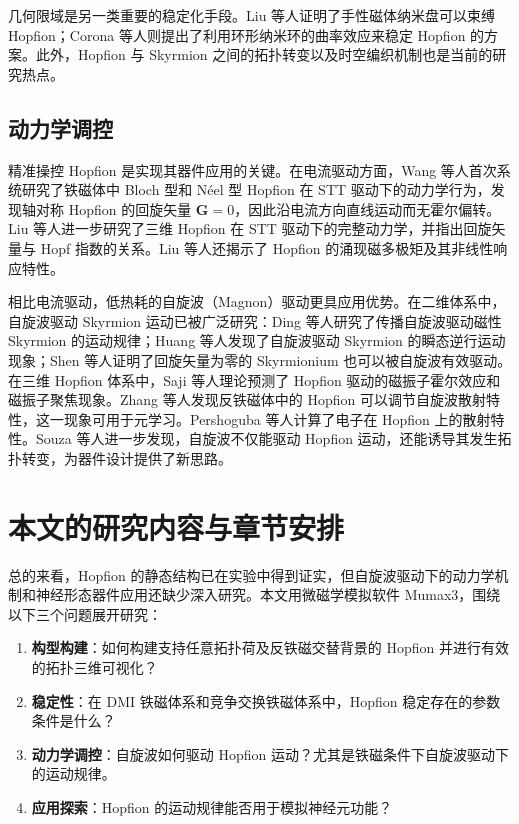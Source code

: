 几何限域是另一类重要的稳定化手段。Liu 等人证明了手性磁体纳米盘可以束缚 Hopfion\cite{liu2018binding}；Corona 等人则提出了利用环形纳米环的曲率效应来稳定 Hopfion 的方案\cite{corona2023curvature}。此外，Hopfion 与 Skyrmion 之间的拓扑转变\cite{gao2024topological,souza2025topological}以及时空编织机制\cite{knapman2024spacetime}也是当前的研究热点。

\subsection{动力学调控}

精准操控 Hopfion 是实现其器件应用的关键。在电流驱动方面，Wang 等人首次系统研究了铁磁体中 Bloch 型和 N\'{e}el 型 Hopfion 在 STT 驱动下的动力学行为，发现轴对称 Hopfion 的回旋矢量 $\mathbf{G} = 0$，因此沿电流方向直线运动而无霍尔偏转\cite{wang2019current}。Liu 等人进一步研究了三维 Hopfion 在 STT 驱动下的完整动力学，并指出回旋矢量与 Hopf 指数的关系\cite{liu2020three}。Liu 等人还揭示了 Hopfion 的涌现磁多极矩及其非线性响应特性\cite{liu2022emergent}。

相比电流驱动，低热耗的自旋波（Magnon）驱动更具应用优势。在二维体系中，自旋波驱动 Skyrmion 运动已被广泛研究：Ding 等人研究了传播自旋波驱动磁性 Skyrmion 的运动规律\cite{ding2015motion}；Huang 等人发现了自旋波驱动 Skyrmion 的瞬态逆行运动现象\cite{huang2023transient}；Shen 等人证明了回旋矢量为零的 Skyrmionium 也可以被自旋波有效驱动\cite{shen2018skyrmionium}。在三维 Hopfion 体系中，Saji 等人理论预测了 Hopfion 驱动的磁振子霍尔效应和磁振子聚焦现象\cite{saji2023magnonic}。Zhang 等人发现反铁磁体中的 Hopfion 可以调节自旋波散射特性，这一现象可用于元学习\cite{zhang2023magnon}。Pershoguba 等人计算了电子在 Hopfion 上的散射特性\cite{pershoguba2021electronic}。Souza 等人进一步发现，自旋波不仅能驱动 Hopfion 运动，还能诱导其发生拓扑转变\cite{souza2025topological}，为器件设计提供了新思路。


\section{本文的研究内容与章节安排}

总的来看，Hopfion 的静态结构已在实验中得到证实，但自旋波驱动下的动力学机制和神经形态器件应用还缺少深入研究。本文用微磁学模拟软件 Mumax3，围绕以下三个问题展开研究：

\begin{enumerate}[label=(\arabic*)]
  \item \textbf{构型构建}：如何构建支持任意拓扑荷及反铁磁交替背景的 Hopfion 并进行有效的拓扑三维可视化？
  \item \textbf{稳定性}：在 DMI 铁磁体系和竞争交换铁磁体系中，Hopfion 稳定存在的参数条件是什么？
  \item \textbf{动力学调控}：自旋波如何驱动 Hopfion 运动？尤其是铁磁条件下自旋波驱动下的运动规律。
  \item \textbf{应用探索}：Hopfion 的运动规律能否用于模拟神经元功能？
\end{enumerate}

